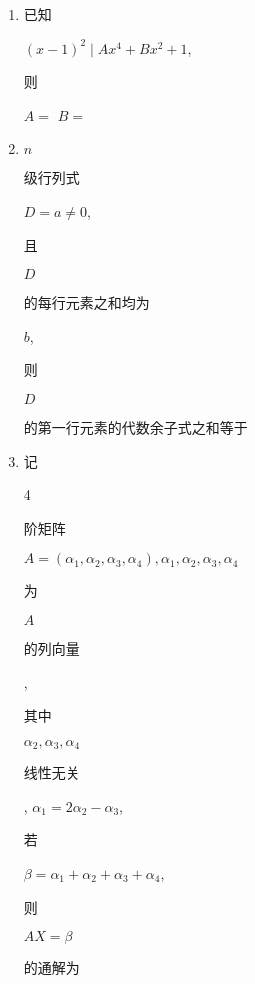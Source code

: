 \documentclass[10pt]{article}
\begin{document}
\begin{enumerate}
  \item \begin{CJK}{UTF8}{mj}已知\end{CJK} $(x-1)^{2} \mid A x^{4}+B x^{2}+1$, \begin{CJK}{UTF8}{mj}则\end{CJK} $A=$ $B=$

  \item $n$ \begin{CJK}{UTF8}{mj}级行列式\end{CJK} $D=a \neq 0$, \begin{CJK}{UTF8}{mj}且\end{CJK} $D$ \begin{CJK}{UTF8}{mj}的每行元素之和均为\end{CJK} $b$, \begin{CJK}{UTF8}{mj}则\end{CJK} $D$ \begin{CJK}{UTF8}{mj}的第一行元素的代数余子式之和等于\end{CJK}

  \item \begin{CJK}{UTF8}{mj}记\end{CJK} 4 \begin{CJK}{UTF8}{mj}阶矩阵\end{CJK} $A=\left(\alpha_{1}, \alpha_{2}, \alpha_{3}, \alpha_{4}\right), \alpha_{1}, \alpha_{2}, \alpha_{3}, \alpha_{4}$ \begin{CJK}{UTF8}{mj}为\end{CJK} $A$ \begin{CJK}{UTF8}{mj}的列向量\end{CJK}, \begin{CJK}{UTF8}{mj}其中\end{CJK} $\alpha_{2}, \alpha_{3}, \alpha_{4}$ \begin{CJK}{UTF8}{mj}线性无关\end{CJK}, $\alpha_{1}=2 \alpha_{2}-\alpha_{3}$, \begin{CJK}{UTF8}{mj}若\end{CJK} $\beta=\alpha_{1}+\alpha_{2}+\alpha_{3}+\alpha_{4}$, \begin{CJK}{UTF8}{mj}则\end{CJK} $A X=\beta$ \begin{CJK}{UTF8}{mj}的通解为\end{CJK}


\end{enumerate}
\end{document}
